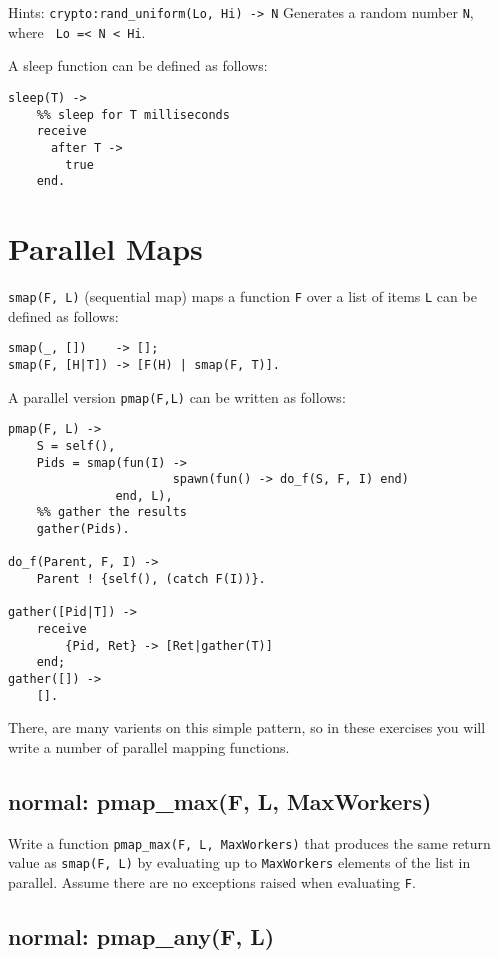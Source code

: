 \documentclass[12pt]{hitec}
\begin{document}
Hints: \verb+crypto:rand_uniform(Lo, Hi) -> N+
Generates a random number \verb+N+, where \verb+ Lo =< N < Hi+.

A sleep function can be defined as follows:

\begin{Verbatim}
sleep(T) ->
    %% sleep for T milliseconds
    receive
      after T ->
        true
    end.
\end{Verbatim}

\section{Parallel Maps}

\verb+smap(F, L)+ (sequential map) maps a function \verb+F+ over a
list of items \verb+L+  can be defined as follows:

\begin{Verbatim}
smap(_, [])    -> [];
smap(F, [H|T]) -> [F(H) | smap(F, T)].
\end{Verbatim}

A parallel version \verb+pmap(F,L)+ can be written as follows:
\begin{Verbatim}
pmap(F, L) -> 
    S = self(),
    Pids = smap(fun(I) -> 
                       spawn(fun() -> do_f(S, F, I) end)
               end, L),
    %% gather the results
    gather(Pids).

do_f(Parent, F, I) ->                                          
    Parent ! {self(), (catch F(I))}.

gather([Pid|T]) ->
    receive
        {Pid, Ret} -> [Ret|gather(T)]
    end;
gather([]) ->
    [].
\end{Verbatim}

There, are many varients on this simple pattern, so in these exercises
you will write a number of parallel mapping functions.

\subsection{normal: pmap\_max(F, L, MaxWorkers)}

Write a function \verb+pmap_max(F, L, MaxWorkers)+ that produces the same return
value as \verb+smap(F, L)+ by evaluating up to \verb+MaxWorkers+ elements of the list
in parallel. Assume there are no exceptions raised when evaluating \verb+F+.

\subsection{normal: pmap\_any(F, L)}
\end{document}
